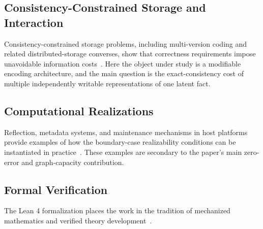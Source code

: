 \subsection{Consistency-Constrained Storage and Interaction}\label{sec:related-distributed}

Consistency-constrained storage problems, including multi-version coding and related distributed-storage converses, show that correctness requirements impose unavoidable information costs~\cite{rashmi2015multiversion}. Here the object under study is a modifiable encoding architecture, and the main question is the exact-consistency cost of multiple independently writable representations of one latent fact.

\subsection{Computational Realizations}\label{sec:related-meta}

Reflection, metadata systems, and maintenance mechanisms in host platforms provide examples of how the boundary-case realizability conditions can be instantiated in practice~\cite{kiczales1991art,smith1984reflection}. These examples are secondary to the paper's main zero-error and graph-capacity contribution.

\subsection{Formal Verification}\label{sec:related-formal}

The Lean 4 formalization places the work in the tradition of mechanized mathematics and verified theory development~\cite{demoura2021lean4,leroy2009compcert}.

